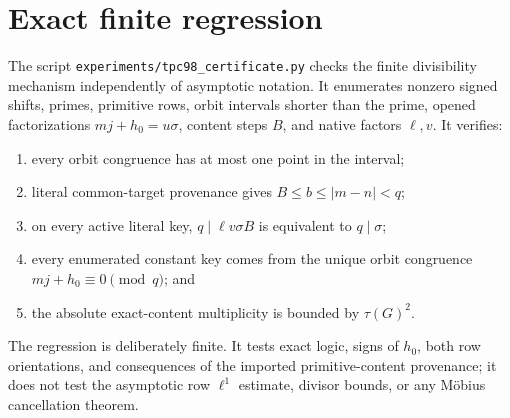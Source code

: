 \section{Exact finite regression}
\label{sec:regression}

The script
\texttt{experiments/tpc98\_certificate.py} checks the finite
divisibility mechanism independently of asymptotic notation.  It
enumerates nonzero signed shifts, primes, primitive rows, orbit
intervals shorter than the prime, opened factorizations
\(mj+h_0=u\sigma\), content steps \(B\), and native factors
\(\ell,v\).  It verifies:
\begin{enumerate}[leftmargin=2em]
\item every orbit congruence has at most one point in the interval;
\item literal common-target provenance gives
  \(B\le b\le|m-n|<q\);
\item on every active literal key,
  \(q\mid\ell v\sigma B\) is equivalent to \(q\mid\sigma\);
\item every enumerated constant key comes from the unique orbit
  congruence \(mj+h_0\equiv0\pmod q\); and
\item the absolute exact-content multiplicity is bounded by
  \(\tau(G)^2\).
\end{enumerate}

The regression is deliberately finite.  It tests exact logic,
signs of \(h_0\), both row orientations, and consequences of the
imported primitive-content provenance; it does
not test the asymptotic row \(\ell^1\) estimate, divisor bounds, or
any M\"obius cancellation theorem.

